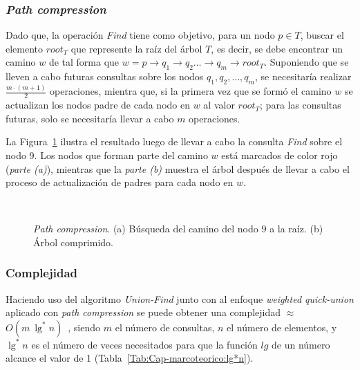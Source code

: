 \subsubsection{\textit{Path compression}}
Dado que, la operación \textit{Find} tiene como objetivo, para un nodo
$p \in T$, buscar el elemento $root_T$ que represente la raíz del árbol $T$,
es decir, se debe encontrar un camino $w$ de tal forma que 
$w = p\rightarrow q_1 \rightarrow q_2 \dots \rightarrow q_m \rightarrow root_T$. 
Suponiendo que se lleven a cabo futuras consultas sobre los nodos
$q_1, q_2, \dots, q_m$, se necesitaría realizar $\frac{m \cdot (m + 1)}{2}$ 
operaciones, mientra que, si la primera vez que se formó el camino $w$ se 
actualizan los nodos padre de cada nodo en $w$ al valor $root_T$; para las 
consultas futuras, solo se necesitaría llevar a cabo $m$ operaciones.

La Figura~\ref{fig:cap-segmentacion:UF_path} ilustra el resultado luego de 
llevar a cabo la consulta \textit{Find} sobre el nodo 9. Los nodos que forman 
parte del camino $w$ está marcados de color rojo (\textit{parte (a)}), 
mientras que la \textit{parte (b)} muestra el árbol después de llevar a cabo 
el proceso de actualización de padres para cada nodo en $w$.

\begin{figure}[h!]
  \centering
	 { \, \, \, \, }
   \\ 
	\caption[\textit{Path compression}]{\textit{Path compression}. (a) Búsqueda 
	del camino del nodo $9$ a la raíz. (b) Árbol comprimido.}
	\label{fig:cap-segmentacion:UF_path}
\end{figure}

\subsubsection{Complejidad}

Haciendo uso del algoritmo \textit{Union-Find} junto con al enfoque 
\textit{weighted quick-union} aplicado con \textit{path compression} se puede
obtener una complejidad $\approx$ $O(m~ \lg^*n)$~\cite{Mirzaian:AofUF:web}, 
siendo $m$ el número de consultas, $n$ el número de elementos, y $\lg^*n$ es 
el número de veces necesitados para que la función $lg$ de un número alcance 
el valor de 1 (Tabla~\ref{Tab:Cap-marcoteorico:lg*n}).

